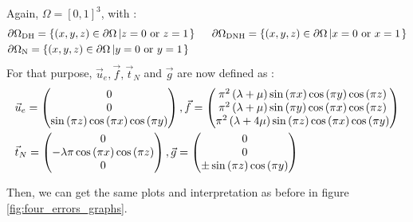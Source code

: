 \documentclass[a4paper,12pt,twoside]{report}
\begin{document}
Again, $\Omega = [0,1]^3$, with : 
\begin{equation*}
	\begin{aligned}
		& \partial \Omega_{\text{DH}} = \left\{  (x,y,z) \in \partial\Omega \left| z = 0 \text{ or } z = 1 \right.  \right\} \hspace{0.5cm} 
		\partial \Omega_{\text{DNH}} = \left\{  (x,y,z) \in \partial\Omega \left| x = 0 \text{ or } x = 1 \right.  \right\} \\
		& \partial \Omega_{\text{N}} = \left\{  (x,y,z) \in \partial\Omega \left| y = 0 \text{ or } y = 1 \right.  \right\}
	\end{aligned}
\end{equation*}
For that purpose, $\vec u_e, \vec f, \vec t_N$ and $\vec g$ are now defined as : 
\begin{equation*}
\begin{aligned}
	& \vec u_e =
	\begin{pmatrix}
		0 \\
		0 \\
		\sin{\left(\pi z \right)} \cos{\left(\pi x \right)} \cos{\left(\pi y \right)}
	\end{pmatrix}, \hfill \vec f =  \begin{pmatrix}
	\pi^{2} \left(\lambda + \mu\right) \sin{\left(\pi x \right)} \cos{\left(\pi y \right)} \cos{\left(\pi z \right)} \\
	\pi^{2} \left(\lambda + \mu\right) \sin{\left(\pi y \right)} \cos{\left(\pi x \right)} \cos{\left(\pi z \right)} \\
	\pi^{2} \left(\lambda + 4 \mu\right) \sin{\left(\pi z \right)} \cos{\left(\pi x \right)} \cos{\left(\pi y \right)}
	\end{pmatrix} \\
	& \vec t_N = \begin{pmatrix}
	0 \\
	- \lambda \pi \cos{\left(\pi x \right)} \cos{\left(\pi z \right)} \\
	0
	\end{pmatrix}, \hfill \vec g = \begin{pmatrix}
	0 \\
	0 \\
	\pm \sin{\left(\pi z \right)} \cos{\left(\pi y \right)}
	\end{pmatrix}
\end{aligned}
\end{equation*} 	

Then, we can get the same plots and interpretation as before in figure \ref{fig:four_errors_graphs}. 
\end{document}
